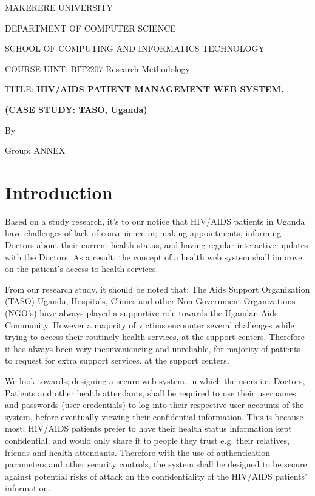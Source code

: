 \documentclass[12pt]{article}
\begin{document}
MAKERERE UNIVERSITY\par

DEPARTMENT OF COMPUTER SCIENCE\par

SCHOOL OF COMPUTING AND INFORMATICS TECHNOLOGY\par

COURSE UINT: BIT2207 Research Methodology\par

TITLE: \textbf{HIV/AIDS PATIENT MANAGEMENT WEB SYSTEM.}\par

\textbf{(CASE STUDY: TASO, Uganda)}\par

By\par

\setlength{\parskip}{0.0pt}
 \tabto{0.25in}  \tabto{0.5in}  \tabto{0.75in}  \tabto{1.0in}  \tabto{1.25in}  \tabto{1.5in}  \tabto{1.75in}  \tabto{2.0in}  \tabto{2.25in}  \tabto{2.5in} Group: ANNEX\par


\vspace{\baselineskip}\setlength{\parskip}{8.04pt}
\section{Introduction}
Based on a study research, it’s to our notice that HIV/AIDS patients in Uganda have challenges of lack of convenience in; making appointments, informing Doctors about their current health status, and having regular interactive updates with the Doctors. As a result; the concept of a health web system shall improve on the patient’s access to health services.\par

From our research study, it should be noted that; The Aids Support Organization (TASO) Uganda, Hospitals, Clinics and other Non-Government Organizations (NGO’s) have always played a supportive role towards the Ugandan Aids Community. However a majority of victims encounter several challenges while trying to access their routinely health services, at the support centers. Therefore it has always been very inconveniencing and unreliable, for majority of patients to request for extra support services, at the support centers.\par

We look towards; designing a secure web system, in which the users i.e. Doctors, Patients and other health attendants, shall be required to use their usernames and passwords (user credentials) to log into their respective user accounts of the system, before eventually viewing their confidential information. This is because most; HIV/AIDS patients prefer to have their health status information kept confidential, and would only share it to people they trust e.g. their relatives, friends and health attendants. Therefore with the use of authentication parameters and other security controls, the system shall be designed to be secure against potential risks of attack on the confidentiality of the HIV/AIDS patients’ information.\par
\end{document}
